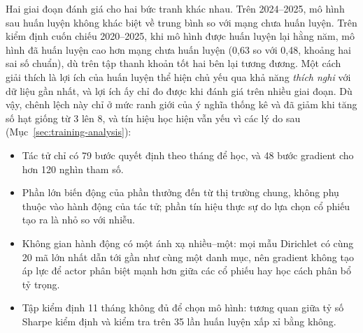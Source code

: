 Hai giai đoạn đánh giá cho hai bức tranh khác nhau. Trên 2024--2025, mô hình sau huấn luyện không khác biệt về trung bình so với mạng chưa huấn luyện. Trên kiểm định cuốn chiếu 2020--2025, khi mô hình được huấn luyện lại hằng năm, mô hình đã huấn luyện cao hơn mạng chưa huấn luyện (0,63 so với 0,48, khoảng hai sai số chuẩn), dù trên tập thanh khoản tốt hai bên lại tương đương. Một cách giải thích là lợi ích của huấn luyện thể hiện chủ yếu qua khả năng \emph{thích nghi} với dữ liệu gần nhất, và lợi ích ấy chỉ đo được khi đánh giá trên nhiều giai đoạn. Dù vậy, chênh lệch này chỉ ở mức ranh giới của ý nghĩa thống kê và đã giảm khi tăng số hạt giống từ 3 lên 8, và tín hiệu học hiện vẫn yếu vì các lý do sau (Mục~\ref{sec:training-analysis}):
\begin{itemize}
  \item Tác tử chỉ có 79 bước quyết định theo tháng để học, và 48 bước gradient cho hơn 120 nghìn tham số.
  \item Phần lớn biến động của phần thưởng đến từ thị trường chung, không phụ thuộc vào hành động của tác tử; phần tín hiệu thực sự do lựa chọn cổ phiếu tạo ra là nhỏ so với nhiễu.
  \item Không gian hành động có một ánh xạ nhiều--một: mọi mẫu Dirichlet có cùng 20 mã lớn nhất dẫn tới gần như cùng một danh mục, nên gradient không tạo áp lực để actor phân biệt mạnh hơn giữa các cổ phiếu hay học cách phân bổ tỷ trọng.
  \item Tập kiểm định 11 tháng không đủ để chọn mô hình: tương quan giữa tỷ số Sharpe kiểm định và kiểm tra trên 35 lần huấn luyện xấp xỉ bằng không.
\end{itemize}
